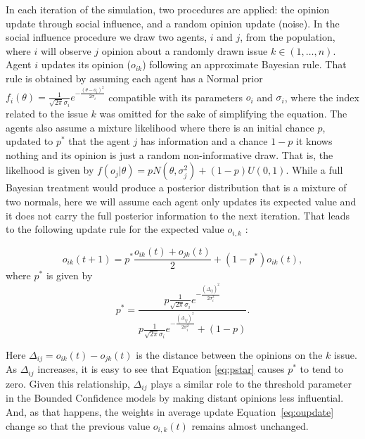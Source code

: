 \documentclass{article}
\begin{document}
In each iteration of the simulation, two procedures are applied: the
opinion update through social influence, and a random opinion update (noise). In
the social influence procedure we draw two agents, \(i\) and \(j\), from the
population, where \(i\) will observe \(j\) opinion about a randomly drawn issue \(k
\in (1 , \ldots, n)\). %
Agent \(i\) updates its opinion (\(o_{ik}\)) following an approximate Bayesian
rule. That rule is obtained by assuming each agent has a Normal prior
\(f_i(\theta) = \frac{1}{\sqrt{2 \pi} \sigma_i} e^{- \frac{(\theta - o_i )^2}{2
    \sigma_i}} \) compatible with its parameters $o_{i}$ and $\sigma_{i}$, where
the index related to the issue $k$ was omitted for the sake of simplifying the
equation. The agents also assume a mixture likelihood where there is an initial
chance \(p\), updated to \(p^*\) that the agent \(j\) has information and a
chance \(1-p\) it knows nothing and its opinion is just a random non-informative
draw. That is, the likelhood is given by \( f(o_j|\theta) = p
N(\theta,\sigma_j^2) + (1-p)U(0,1) \). While a full Bayesian treatment would
produce a posterior distribution that is a mixture of two normals, here we will
assume each agent only updates its expected value and it does not carry the full
posterior information to the next iteration. That leads to the following update
rule for the expected value $o_{i,k}$ \cite{martins2009bayesian}:


  \begin{equation}\label{eq:oupdate}
    o_{ik}(t+1) =
    p^{*}
    \frac{o_{ik}(t) + o_{jk}(t) }{2}
    +
    (1 - p^{*})
    o_{ik}(t),
  \end{equation}
where  $p^{*}$ is given by
  \begin{equation}\label{eq:pstar}
   p^{*}
    =
  \frac{
      p \frac{1}{\sqrt{2 \pi} \sigma_i}
      e^{- \frac{ (\Delta_{ij})^2}{2 \sigma_i^2}}
    }{
      p
      \frac{1}{\sqrt{2 \pi} \sigma_i}
    e^{- \frac{ ( \Delta_{ij})^2}{2 \sigma_i^2}}
    +
    (1 - p)
  }.
\end{equation}

Here \(\Delta_{ij} = o_{ik} (t) - o_{jk} (t)\) is the distance between the
opinions on the $k$ issue. As $\Delta_{ij}$ increases, it is easy to see that
Equation \ref{eq:pstar} causes $p^{*}$ to tend to zero. Given this relationship,
$\Delta_{ij}$ plays a similar role to the threshold parameter in the Bounded
Confidence models by making distant opinions less influential. And, as that
happens, the weights in average update Equation~\ref{eq:oupdate} change so that
the previous value $ o_{i,k}(t)$ remains almost unchanged.
\end{document}

